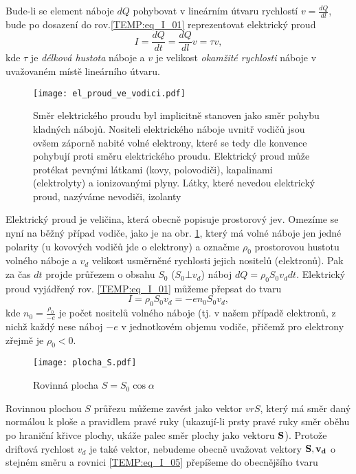 {      Bude-li se element náboje $dQ$ pohybovat v lineárním útvaru rychlostí $v = \frac{dQ}{dl}$,
      bude po dosazení do rov.\ref{TEMP:eq_I_01} reprezentovat elektrický proud 
        \begin{equation}\label{TEMP:eq_I_04}
          I = \frac{dQ}{dt} = \frac{dQ}{dl}v = \tau v, 
        \end{equation}      
      kde $\tau$ je \emph{délková hustota} náboje a $v$ je velikost \emph{okamžité rychlosti}
      náboje v uvažovaném místě lineárního útvaru. 

      \begin{figure}[ht!]
         \centering
         \texttt{[image: el\_proud\_ve\_vodici.pdf]}
         \caption[Náboje, pohybující se vodičem]{Směr elektrického proudu byl implicitně stanoven
                  jako směr pohybu kladných nábojů. Nositeli elektrického náboje uvnitř vodičů jsou
                  ovšem záporně nabité volné elektrony, které se tedy dle  konvence pohybují proti
                  směru elektrického proudu. Elektrický proud může protékat pevnými látkami (kovy,
                  polovodiči), kapalinami (elektrolyty) a ionizovanými plyny. Látky, které nevedou
                  elektrický proud, nazýváme nevodiči, izolanty}
         \label{TEMP:fig_el_proud_ve_vodici}
      \end{figure}
      
      Elektrický proud je veličina, která obecně popisuje prostorový jev. Omezíme se nyní na běžný
      případ vodiče, jako je na obr. \ref{TEMP:fig_el_proud_ve_vodici}, který má volné náboje jen
      jedné polarity (u kovových vodičů jde o elektrony) a označme $\rho_0$ prostorovou hustotu
      volného náboje a $v_d$ velikost usměrněné rychlosti jejich nositelů (elektronů). Pak za čas
      $dt$ projde průřezem o obsahu $S_0$ ($S_0\bot v_d$) náboj $dQ = \rho_0 S_0 v_d dt$.
      Elektrický proud vyjádřený rov.
      \ref{TEMP:eq_I_01} můžeme přepsat do tvaru
        \begin{equation}\label{TEMP:eq_I_05}
          I = \rho_0 S_0 v_d = - e n_0 S_0 v_d, 
        \end{equation}         
      kde $\displaystyle{n_0 = \frac{\rho_0}{-e}}$ je počet nositelů volného náboje (tj. v našem
      případě elektronů, z nichž každý nese náboj $-e$ v jednotkovém objemu vodiče, přičemž pro
      elektrony zřejmě je $\rho_0<0$.

      \begin{wrapfigure}[14]{r}{5cm}
        \centering
        \texttt{[image: plocha\_S.pdf]}
        \caption[Rovinná plocha $S$.]{Rovinná plocha $S = S_0\cos\alpha$}
        \label{TEMP:fig_plocha_S}
      \end{wrapfigure}
      Rovinnou plochou $S$ průřezu můžeme zavést jako vektor $vr{S}$, který má směr daný normálou k
      ploše a pravidlem pravé ruky (ukazují-li prsty pravé ruky směr oběhu po hraniční křivce
      plochy, ukáže palec směr plochy jako vektoru $\mathbf{S}$). Protože driftová rychlost $v_d$ je
      také vektor, nebudeme obecně uvažovat vektory $\mathbf{S}, \mathbf{v_d}$ o stejném směru a rovnici
      \ref{TEMP:eq_I_05} přepíšeme do obecnějšího tvaru      
      
}
